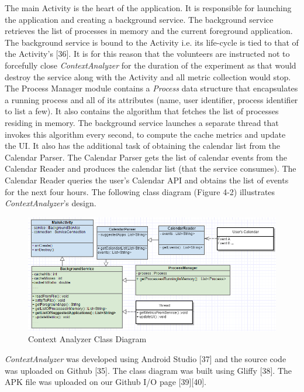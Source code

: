 \documentclass[12pt]{uthesis-v12}  %
\begin{document}
		The main Activity is the heart of the application. It is responsible for launching the application and creating a background service. The background service retrieves the list of processes in memory and the current foreground application. The background service is bound to the Activity i.e. its life-cycle is tied to that of the Activity's [36]. It is for this reason that the volunteers are instructed not to forcefully close {\em ContextAnalyzer} for the duration of the experiment as that would destroy the service along with the Activity and all metric collection would stop. The Process Manager module contains a {\em Process} data structure that encapsulates a running process and all of its attributes (name, user identifier, process identifier to list a few). It also contains the algorithm that fetches the list of processes residing in memory. The background service launches a separate thread that invokes this algorithm every second, to compute the cache metrics and update the UI. It also has the additional task of obtaining the calendar list from the Calendar Parser. The Calendar Parser gets the list of calendar events from the Calendar Reader and produces the calendar list (that the service consumes). The Calendar Reader queries the user's Calendar API and obtains the list of events for the next four hours. The following class diagram (Figure 4-2) illustrates {\em ContextAnalyzer}'s design.
	
		\begin{figure}[h]
			\centering
			\includegraphics[width = 150mm]{images/contextAnalyzerDesign.png}
			\caption[Context Analyzer Class Diagram]{Context Analyzer Class Diagram}
		\end{figure}
		   

		{\em ContextAnalyzer} was developed using Android Studio [37] and the source code was uploaded on Github [35]. The class diagram was built using Gliffy [38]. The APK file was uploaded on our Github I/O page [39][40].
\end{document}
